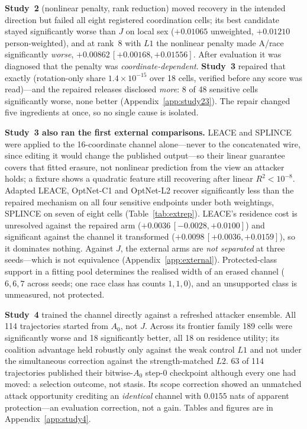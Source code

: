 \documentclass[10pt]{article}
\begin{document}
\textbf{Study~2} (nonlinear penalty, rank reduction) moved recovery in the intended direction but failed all
eight registered coordination cells; its best candidate stayed significantly worse than $J$ on local sex
($+0.01065$ unweighted, $+0.01210$ person-weighted), and at rank~8 with $L1$ the nonlinear penalty made
A/race significantly \emph{worse}, $+0.00862\,[+0.00168,+0.01556]$. After evaluation it was diagnosed that
the penalty was \emph{coordinate-dependent}. \textbf{Study~3} repaired that exactly (rotation-only share
$1.4\times10^{-15}$ over 18 cells, verified before any score was read)---and the repaired releases disclosed
\emph{more}: 8 of 48 sensitive cells significantly worse, none better (Appendix~\ref{app:study23}). The repair
changed five ingredients at once, so no single cause is isolated.

\begin{table}[t]
\centering\footnotesize

\caption{Study~3: adapted published methods against the repaired mechanism at rank 16 with the coalition
policy. Every arm transforms only the auxiliary channel and appends it to unchanged $H_A$.
\noteExternalVsRepaired}
\label{tab:extrep}
\end{table}

\textbf{Study~3 also ran the first external comparisons.} LEACE \citep{belrose2023leace} and SPLINCE
\citep{holstege2025splince} were applied to the 16-coordinate channel alone---never to the concatenated
wire, since editing it would change the published output---so their linear guarantee covers that fitted
erasure, not nonlinear prediction from the view an attacker holds; a fixture shows a quadratic feature
still recovering after linear $R^2<10^{-8}$. Adapted LEACE, OptNet-C1 and OptNet-L2 recover significantly
less than the repaired mechanism on all four sensitive endpoints under both weightings, SPLINCE on seven of
eight cells (Table~\ref{tab:extrep}). LEACE's residence cost is unresolved against the repaired arm
($+0.0036\,[-0.0028,+0.0100]$) and significant against the channel it transformed
($+0.0098\,[+0.0036,+0.0159]$), so it dominates nothing. Against $J$, the external arms are \emph{not
separated} at three seeds---which is not equivalence (Appendix~\ref{app:external}). Protected-class support
in a fitting pool determines the realised width of an erased channel ($6,6,7$ across seeds; one race class
has counts $1,1,0$), and an unsupported class is unmeasured, not protected.

\textbf{Study~4} trained the channel directly against a refreshed attacker ensemble. All 114 trajectories
started from $A_0$, not $J$. Across its frontier family 189 cells were significantly worse and 18
significantly better, all 18 on residence utility; its coalition advantage held robustly only against the
weak control $L1$ and not under the simultaneous correction against the strength-matched $L2$. 63 of 114
trajectories published their bitwise-$A_0$ step-0 checkpoint although every one had moved: a selection
outcome, not stasis. Its scope correction showed an unmatched attack opportunity crediting an
\emph{identical} channel with $0.0155$ nats of apparent protection---an evaluation correction, not a gain.
Tables and figures are in Appendix~\ref{app:study4}.
\end{document}
